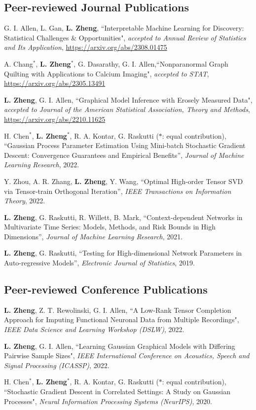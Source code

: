 \documentclass[letterpaper,11pt]{article}
\begin{document}
	\subsection*{Peer-reviewed Journal Publications}
	\begin{etaremune}[start=10]
		\item G. I. Allen, L. Gan, {\bf L. Zheng}, ``Interpretable Machine Learning for Discovery: Statistical Challenges \& Opportunities", {\em accepted to Annual Review of Statistics and Its Application}, \href{https://arxiv.org/abs/2308.01475}{https://arxiv.org/abs/2308.01475}
		\item  A. Chang$^{*}$, {\bf L. Zheng}$^{*}$, G. Dasarathy, G. I. Allen,``Nonparanormal Graph Quilting with Applications to Calcium Imaging", {\em accepted to STAT}, \href{https://arxiv.org/abs/2305.13491}{https://arxiv.org/abs/2305.13491}
		\item {\bf L. Zheng}, G. I. Allen, ``Graphical Model Inference with Erosely Measured Data", {\em accepted to Journal of the American Statistical Association, Theory and Methods}, \href{https://arxiv.org/abs/2210.11625}{https://arxiv.org/abs/2210.11625}
		\item H. Chen$^{*}$, {\bf L. Zheng}$^{*}$, R. A. Kontar, G. Raskutti ($*$: equal contribution), ``Gaussian Process Parameter Estimation Using Mini-batch Stochastic Gradient Descent: Convergence Guarantees and Empirical Benefits'', {\em Journal of Machine Learning Research}, 2022.
		\item Y. Zhou, A. R. Zhang, {\bf L. Zheng}, Y. Wang, ``Optimal High-order Tensor SVD via Tensor-train Orthogonal
		Iteration'', {\em  IEEE Transactions on Information Theory}, 2022.
		\item {\bf L. Zheng}, G. Raskutti, R. Willett, B. Mark, ``Context-dependent Networks in Multivariate Time Series: Models, Methods, and Risk Bounds in High Dimensions'', {\em Journal of Machine Learning Research}, 2021.
		\item {\bf L. Zheng}, G. Raskutti, ``Testing for High-dimensional Network Parameters in Auto-regressive Models'', {\em Electronic Journal of Statistics}, 2019.
	\end{etaremune}
	\subsection*{Peer-reviewed Conference Publications}
\begin{etaremune}[start=3]
	\item {\bf L. Zheng}, Z. T. Rewolinski, G. I. Allen, ``A Low-Rank Tensor Completion Approach for Imputing Functional Neuronal Data from Multiple Recordings", {\em IEEE Data Science and Learning Workshop (DSLW)}, 2022.
	\item {\bf L. Zheng}, G. I. Allen, ``Learning Gaussian Graphical Models with Differing Pairwise Sample Sizes", {\em IEEE International Conference on Acoustics, Speech and Signal Processing (ICASSP)}, 2022.
	\item  H. Chen$^{*}$, {\bf L. Zheng}$^{*}$, R. A. Kontar, G. Raskutti ($*$: equal contribution), ``Stochastic Gradient Descent in Correlated Settings: A Study on Gaussian Processes", {\em Neural Information Processing Systems (NeurIPS)}, 2020.
\end{etaremune}
\end{document}
